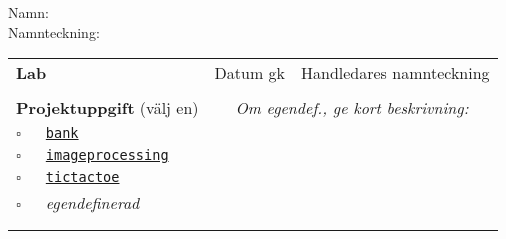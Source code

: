 \vspace{2.5em}\noindent Namn: \dotfill\\

\vspace{1em}\noindent Namnteckning: \dotfill\\

\newcommand{\LabRow}[1]{\\[-1.1em] \hyperref[section:lab:#1]{\texttt{#1}} & \dotfill &  \dotfill  \\ \addlinespace }

\begin{table}[h]
\centering
\vspace{1em}
\begin{tabular}{lcc}
\toprule \addlinespace
{\sffamily\bfseries\small Lab} & {\sffamily\small Datum gk} &	{\sffamily\small Handledares namnteckning}\\ \addlinespace \midrule \\[-0.5em]

\addlinespace \midrule \addlinespace
{\sffamily\small {\bfseries Projektuppgift} (välj en)	} &
\multicolumn{2}{c}{\textit{Om egendef., ge kort beskrivning:}}  \\
\addlinespace\addlinespace %
{\Large$\square$}\texttt{~~~\hyperref[section:proj:bank]{bank}}  &  &  \\
{\Large$\square$}\texttt{~~~\hyperref[section:proj:imageprocessing]{imageprocessing}}  \\
{\Large$\square$}\texttt{~~~\hyperref[section:proj:tictactoe]{tictactoe}} \\
{\Large$\square$}\texttt{~~~}\textit{egendefinerad}  \\
\\
\\
\bottomrule
\end{tabular}
\end{table}
